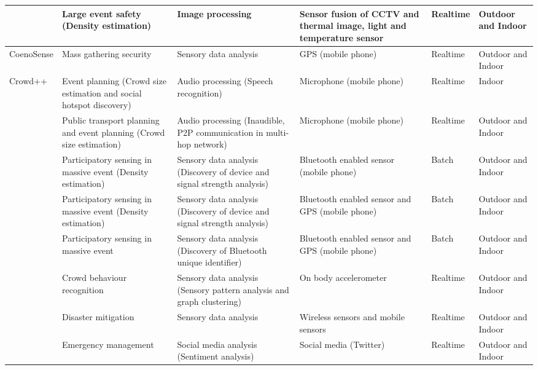 \begin{center}
\begin{longtable}{|p{2cm}|p{2.5cm}|p{2.5cm}|p{2cm}|p{1.5cm}|p{2cm}|}
		\hline
		\citet{Yaseen2013} & Large event safety (Density estimation) & Image processing & Sensor fusion of CCTV and thermal image, light and temperature sensor& Realtime & Outdoor and Indoor \\
		\hline
		CoenoSense \citep{Wirz2012} & Mass gathering security & Sensory data analysis & GPS (mobile phone) & Realtime & Outdoor and Indoor \\
		\hline
		Crowd++ \citep{Xu2013} & Event planning (Crowd size estimation and social hotspot discovery) & Audio processing (Speech recognition) & Microphone (mobile phone) & Realtime & Indoor\\
		\hline
		\citet{Kannan2012} & Public transport planning and  event planning (Crowd size estimation) & Audio processing (Inaudible, P2P communication in multi-hop network) & Microphone (mobile phone) & Realtime & Outdoor and Indoor \\
		\hline
		\citet{Weppner2011} & Participatory sensing in massive event (Density estimation) & Sensory data analysis (Discovery of device and signal strength analysis) & Bluetooth enabled sensor (mobile phone) & Batch & Outdoor and Indoor \\
		\hline
		\citet{Weppner2013} & Participatory sensing in massive event (Density estimation) & Sensory data analysis (Discovery of device and signal strength analysis) & Bluetooth enabled sensor and GPS (mobile phone) & Batch & Outdoor and Indoor \\
		\hline
		\citet{Stopczynski2013} & Participatory sensing in massive event & Sensory data analysis (Discovery of Bluetooth unique identifier) & Bluetooth enabled sensor and GPS (mobile phone) & Batch & Outdoor and Indoor \\
		\hline
		\citet{Roggen2011} & Crowd behaviour recognition & Sensory data analysis (Sensory pattern analysis and graph clustering) & On body accelerometer & Realtime & Outdoor and Indoor \\
		\hline
		\citet{Ramesh2014} & Disaster mitigation & Sensory data analysis & Wireless sensors and mobile sensors & Realtime & Outdoor and Indoor \\
		\hline
		\citet{DelirHaghighi2013} & Emergency management & Social media analysis (Sentiment analysis) & Social media (Twitter) & Realtime & Outdoor and Indoor \\
		\hline
	\end{longtable}
\end{center}

